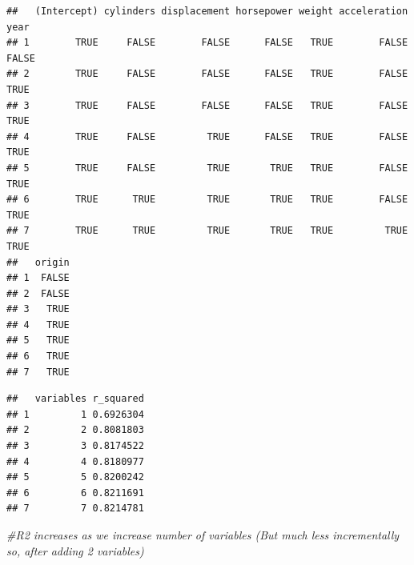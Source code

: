\documentclass[]{article}
\newenvironment{Shaded}{\begin{snugshade}}{\end{snugshade}}
\newcommand{\KeywordTok}[1]{\textcolor[rgb]{0.13,0.29,0.53}{\textbf{#1}}}
\newcommand{\DataTypeTok}[1]{\textcolor[rgb]{0.13,0.29,0.53}{#1}}
\newcommand{\DecValTok}[1]{\textcolor[rgb]{0.00,0.00,0.81}{#1}}
\newcommand{\CommentTok}[1]{\textcolor[rgb]{0.56,0.35,0.01}{\textit{#1}}}
\newcommand{\OperatorTok}[1]{\textcolor[rgb]{0.81,0.36,0.00}{\textbf{#1}}}
\newcommand{\NormalTok}[1]{#1}
\begin{document}
\begin{verbatim}
##   (Intercept) cylinders displacement horsepower weight acceleration  year
## 1        TRUE     FALSE        FALSE      FALSE   TRUE        FALSE FALSE
## 2        TRUE     FALSE        FALSE      FALSE   TRUE        FALSE  TRUE
## 3        TRUE     FALSE        FALSE      FALSE   TRUE        FALSE  TRUE
## 4        TRUE     FALSE         TRUE      FALSE   TRUE        FALSE  TRUE
## 5        TRUE     FALSE         TRUE       TRUE   TRUE        FALSE  TRUE
## 6        TRUE      TRUE         TRUE       TRUE   TRUE        FALSE  TRUE
## 7        TRUE      TRUE         TRUE       TRUE   TRUE         TRUE  TRUE
##   origin
## 1  FALSE
## 2  FALSE
## 3   TRUE
## 4   TRUE
## 5   TRUE
## 6   TRUE
## 7   TRUE
\end{verbatim}

\begin{Shaded}
\end{Shaded}

\begin{verbatim}
##   variables r_squared
## 1         1 0.6926304
## 2         2 0.8081803
## 3         3 0.8174522
## 4         4 0.8180977
## 5         5 0.8200242
## 6         6 0.8211691
## 7         7 0.8214781
\end{verbatim}

\begin{Shaded}
\begin{Highlighting}[]
\CommentTok{#R2 increases as we increase number of variables (But much less incrementally so, after adding 2 variables)}
\end{Highlighting}
\end{Shaded}

\begin{Shaded}
\end{Shaded}
\end{document}

